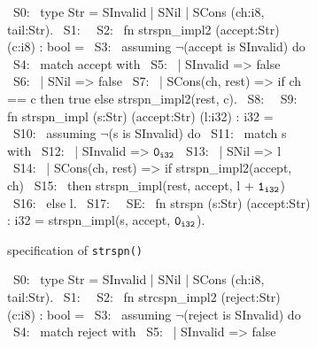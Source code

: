 \begin{figure}[H]\ContinuedFloat
\captionsetup[]{skip=-7pt}
\captionsetup[subfigure]{skip=-7pt}
\begin{subfigure}[b]{\textwidth}
\begin{center}
\begin{allLangEnvFoot}
~{\tiny \textcolor{mygray}{S0:\phantom{ }}}~ type Str = SInvalid | SNil | SCons (ch:i8, tail:Str).
~{\tiny \textcolor{mygray}{S1:\phantom{ }}}~ 
~{\tiny \textcolor{mygray}{S2:\phantom{ }}}~ fn strspn_impl2 (accept:Str) (c:i8) : bool =
~{\tiny \textcolor{mygray}{S3:\phantom{ }}}~   assuming $\neg$(accept is SInvalid) do
~{\tiny \textcolor{mygray}{S4:\phantom{ }}}~   match accept with
~{\tiny \textcolor{mygray}{S5:\phantom{ }}}~   | SInvalid => false
~{\tiny \textcolor{mygray}{S6:\phantom{ }}}~   | SNil => false
~{\tiny \textcolor{mygray}{S7:\phantom{ }}}~   | SCons(ch, rest) => if ch == c then true else strspn_impl2(rest, c).
~{\tiny \textcolor{mygray}{S8:\phantom{ }}}~ 
~{\tiny \textcolor{mygray}{S9:\phantom{ }}}~ fn strspn_impl (s:Str) (accept:Str) (l:i32) : i32 =
~{\tiny \textcolor{mygray}{S10:}}~   assuming $\neg$(s is SInvalid) do
~{\tiny \textcolor{mygray}{S11:}}~   match s with
~{\tiny \textcolor{mygray}{S12:}}~   | SInvalid => ${\tt 0_{i32}}$
~{\tiny \textcolor{mygray}{S13:}}~   | SNil => l
~{\tiny \textcolor{mygray}{S14:}}~   | SCons(ch, rest) => if strspn_impl2(accept, ch)
~{\tiny \textcolor{mygray}{S15:}}~                        then strspn_impl(rest, accept, l + ${\tt 1_{i32}}$)
~{\tiny \textcolor{mygray}{S16:}}~                        else l.
~{\tiny \textcolor{mygray}{S17:}}~ 
~{\tiny \textcolor{mygray}{SE:\phantom{ }}}~ fn strspn (s:Str) (accept:Str) : i32 = strspn_impl(s, accept, ${\tt 0_{i32}}$).
\end{allLangEnvFoot}
\end{center}
\caption{\SpecL{} specification of {\tt strspn()}}
\end{subfigure}
\begin{subfigure}[b]{\textwidth}
\begin{center}
\begin{allLangEnvFoot}
~{\tiny \textcolor{mygray}{S0:\phantom{ }}}~ type Str = SInvalid | SNil | SCons (ch:i8, tail:Str).
~{\tiny \textcolor{mygray}{S1:\phantom{ }}}~ 
~{\tiny \textcolor{mygray}{S2:\phantom{ }}}~ fn strcspn_impl2 (reject:Str) (c:i8) : bool =
~{\tiny \textcolor{mygray}{S3:\phantom{ }}}~   assuming $\neg$(reject is SInvalid) do
~{\tiny \textcolor{mygray}{S4:\phantom{ }}}~   match reject with
~{\tiny \textcolor{mygray}{S5:\phantom{ }}}~   | SInvalid => false

\end{allLangEnvFoot}
\end{center}
\end{subfigure}
\end{figure}
